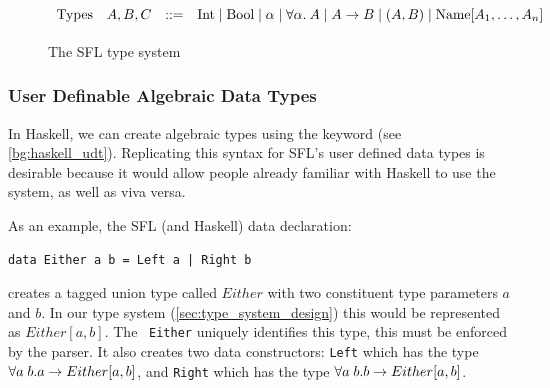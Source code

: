 % 


\begin{figure}
    \[
        \begin{array}{llcl}
            \text{Types} & A, B, C & \mathrel{::=} &
                \text{Int} \mathrel{\mid} 
                \text{Bool} \mathrel{\mid} 
                \alpha \mathrel{\mid} \forall\alpha.\:{A} \mathrel{\mid} 
                A \rightarrow B \mathrel{\mid} (A, B) \mathrel{\mid} \text{Name}[A_1, \dots, A_n]
            \\[2pt]
        \end{array}
    \]
    \caption{The SFL type system}
    \label{fig:sfl_types_no_exst}
\end{figure}

\subsubsection{User Definable Algebraic Data Types}
\label{c2:design_data_types}
In Haskell, we can create algebraic types using the  keyword (see \ref{bg:haskell_udt}). Replicating this syntax for \ac{SFL}'s user defined data types is desirable because it would allow people already familiar with Haskell to use the system, as well as viva versa. 

As an example, the SFL (and Haskell) data declaration:
\begin{lstlisting}[language=SFL_unboxed_noprelude]
data Either a b = Left a | Right b
\end{lstlisting}
\noindent creates a tagged union type called $Either$ with two constituent type parameters $a$ and $b$. In our type system (\ref{sec:type_system_design}) this would be represented as $Either[a, b]$. The \Unionname 
 \ \verb|Either| uniquely identifies this type, this must be enforced by the parser. It also creates two data constructors: \verb|Left| which has the type $\forall a\;b. a \rightarrow Either[a,b]$, and \verb|Right| which has the type $\forall a\;b. b \rightarrow Either[a,b]$. 

